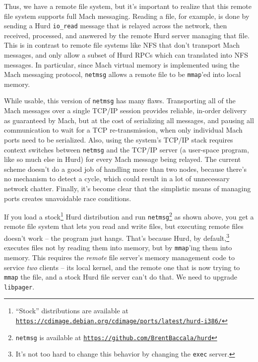 \documentclass{article}
\def\libpager{{\tt libpager}\xspace}
\def\netmsg{{\tt netmsg}\xspace}
\begin{document}
Thus, we have a remote file system, but it's important to realize that
this remote file system supports full Mach messaging.  Reading a file,
for example, is done by sending a Hurd {\tt io_read} message that is
relayed across the network, then received, processed, and answered by
the remote Hurd server managing that file.  This is in contrast to
remote file systems like NFS that don't transport Mach messages, and
only allow a subset of Hurd RPCs which can translated into NFS
messages.  In particular, since Mach virtual memory is implemented
using the Mach messaging protocol, \netmsg allows a remote file to be
{\tt mmap}'ed into local memory.

While usable, this version of \netmsg has many flaws.  Transporting
all of the Mach messages over a single TCP/IP session provides
reliable, in-order delivery as guaranteed by Mach, but at the cost of
serializing all messages, and pausing all communication to wait for a
TCP re-transmission, when only individual Mach ports need to be
serialized.  Also, using the system's TCP/IP stack requires context
switches between \netmsg and the TCP/IP server (a user-space program,
like so much else in Hurd) for every Mach message being relayed.  The
current scheme doesn't do a good job of handling more than two nodes,
because there's no mechanism to detect a cycle, which could result in
a lot of unnecessary network chatter.  Finally, it's become clear that
the simplistic means of managing ports creates unavoidable race
conditions.


If you load a stock\footnote{``Stock'' distributions are available at
  \href{https://cdimage.debian.org/cdimage/ports/latest/hurd-i386/}{\tt https://cdimage.debian.org/cdimage/ports/latest/hurd-i386/}}
Hurd distribution and run \netmsg\footnote{\netmsg is available at \href{https://github.com/BrentBaccala/hurd}{\tt https://github.com/BrentBaccala/hurd}} as shown above, you get a remote
file system that lets you read and write files, but executing remote
files doesn't work -- the program just hangs.
That's because Hurd, by default,\footnote{It's not too hard to change
  this behavior by changing the {\tt exec} server.} executes files
not by reading them into memory, but by {\tt mmap}'ing them into
memory.  This requires the {\it remote} file server's memory
management code to service {\it two} clients -- its local kernel, and
the remote one that is now trying to {\tt mmap} the file, and a stock
Hurd file server can't do that.  We need to upgrade {\tt libpager}.
\end{document}
